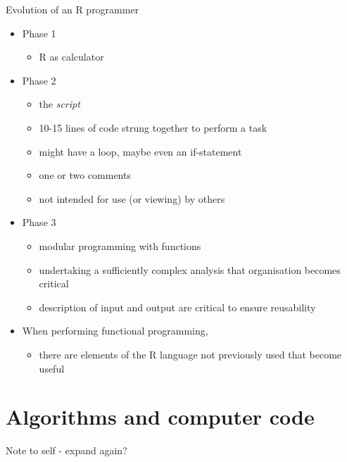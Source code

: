 \documentclass[ignorenonframetext,]{beamer}
\providecommand{\tightlist}{%
  \setlength{\itemsep}{0pt}\setlength{\parskip}{0pt}}
\begin{document}
\begin{frame}{Evolution of an R programmer}

\begin{itemize}[<+->]
\tightlist
\item
  Phase 1

  \begin{itemize}[<+->]
  \tightlist
  \item
    R as calculator
  \end{itemize}
\item
  Phase 2

  \begin{itemize}[<+->]
  \tightlist
  \item
    the \emph{script}
  \item
    10-15 lines of code strung together to perform a task
  \item
    might have a loop, maybe even an if-statement
  \item
    one or two comments
  \item
    not intended for use (or viewing) by others
  \end{itemize}
\item
  Phase 3

  \begin{itemize}[<+->]
  \tightlist
  \item
    modular programming with functions
  \item
    undertaking a sufficiently complex analysis that organisation
    becomes critical
  \item
    description of input and output are critical to ensure reusability
  \end{itemize}
\item
  When performing functional programming,

  \begin{itemize}[<+->]
  \tightlist
  \item
    there are elements of the R language not previously used that become
    useful
  \end{itemize}
\end{itemize}

\end{frame}

\section{Algorithms and computer
code}\label{algorithms-and-computer-code}

Note to self - expand again?
\end{document}
